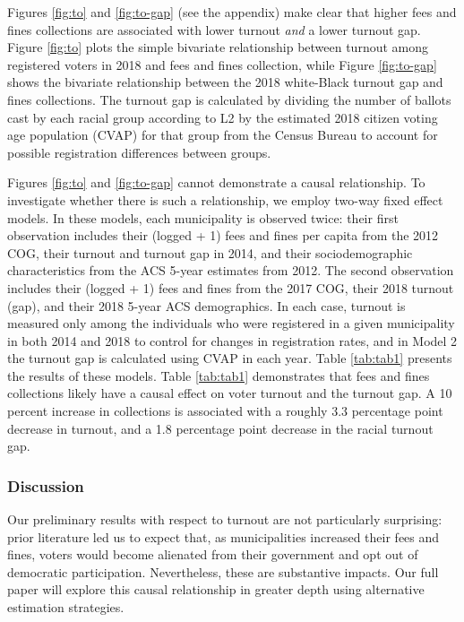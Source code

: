 \documentclass[
  12pt,
]{article}
\begin{document}
Figures \ref{fig:to} and \ref{fig:to-gap} (see the appendix) make clear that higher fees and fines collections are associated with lower turnout \emph{and} a lower turnout gap. Figure \ref{fig:to} plots the simple bivariate relationship between turnout among registered voters in 2018 and fees and fines collection, while Figure \ref{fig:to-gap} shows the bivariate relationship between the 2018 white-Black turnout gap and fines collections. The turnout gap is calculated by dividing the number of ballots cast by each racial group according to L2 by the estimated 2018 citizen voting age population (CVAP) for that group from the Census Bureau to account for possible registration differences between groups.

Figures \ref{fig:to} and \ref{fig:to-gap} cannot demonstrate a causal relationship. To investigate whether there is such a relationship, we employ two-way fixed effect models. In these models, each municipality is observed twice: their first observation includes their (logged + 1) fees and fines per capita from the 2012 COG, their turnout and turnout gap in 2014, and their sociodemographic characteristics from the ACS 5-year estimates from 2012. The second observation includes their (logged + 1) fees and fines from the 2017 COG, their 2018 turnout (gap), and their 2018 5-year ACS demographics. In each case, turnout is measured only among the individuals who were registered in a given municipality in both 2014 and 2018 to control for changes in registration rates, and in Model 2 the turnout gap is calculated using CVAP in each year. Table \ref{tab:tab1} presents the results of these models. Table \ref{tab:tab1} demonstrates that fees and fines collections likely have a causal effect on voter turnout and the turnout gap. A 10 percent increase in collections is associated with a roughly 3.3 percentage point decrease in turnout, and a 1.8 percentage point decrease in the racial turnout gap.

\hypertarget{discussion}{%
\subsubsection*{Discussion}\label{discussion}}

Our preliminary results with respect to turnout are not particularly surprising: prior literature led us to expect that, as municipalities increased their fees and fines, voters would become alienated from their government and opt out of democratic participation. Nevertheless, these are substantive impacts. Our full paper will explore this causal relationship in greater depth using alternative estimation strategies.
\end{document}
